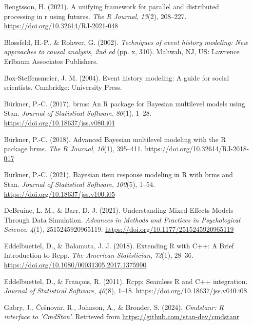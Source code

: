 \documentclass[
  man, donotrepeattitle,floatsintext]{apa6}
\newlength{\cslhangindent}
\newenvironment{CSLReferences}[2] %
 {\begin{list}{}{%
  \setlength{\itemindent}{0pt}
  \setlength{\leftmargin}{0pt}
  \setlength{\parsep}{0pt}
  \ifodd #1
   \setlength{\leftmargin}{\cslhangindent}
   \setlength{\itemindent}{-1\cslhangindent}
  \fi
  \setlength{\itemsep}{#2\baselineskip}}}
 {\end{list}}
\begin{document}
\begin{CSLReferences}{1}{0}
Bengtsson, H. (2021). A unifying framework for parallel and distributed processing in r using futures. \emph{The R Journal}, \emph{13}(2), 208--227. \url{https://doi.org/10.32614/RJ-2021-048}

Blossfeld, H.-P., \& Rohwer, G. (2002). \emph{Techniques of event history modeling: {New} approaches to causal analysis, 2nd ed} (pp. x, 310). Mahwah, NJ, US: Lawrence Erlbaum Associates Publishers.

Box-Steffensmeier, J. M. (2004). Event history modeling: A guide for social scientists. Cambridge: University Press.

Bürkner, P.-C. (2017). {brms}: An {R} package for {Bayesian} multilevel models using {Stan}. \emph{Journal of Statistical Software}, \emph{80}(1), 1--28. \url{https://doi.org/10.18637/jss.v080.i01}

Bürkner, P.-C. (2018). Advanced {Bayesian} multilevel modeling with the {R} package {brms}. \emph{The R Journal}, \emph{10}(1), 395--411. \url{https://doi.org/10.32614/RJ-2018-017}

Bürkner, P.-C. (2021). Bayesian item response modeling in {R} with {brms} and {Stan}. \emph{Journal of Statistical Software}, \emph{100}(5), 1--54. \url{https://doi.org/10.18637/jss.v100.i05}

DeBruine, L. M., \& Barr, D. J. (2021). Understanding {Mixed-Effects Models Through Data Simulation}. \emph{Advances in Methods and Practices in Psychological Science}, \emph{4}(1), 2515245920965119. \url{https://doi.org/10.1177/2515245920965119}

Eddelbuettel, D., \& Balamuta, J. J. (2018). {Extending {R} with {C++}: A Brief Introduction to {Rcpp}}. \emph{The American Statistician}, \emph{72}(1), 28--36. \url{https://doi.org/10.1080/00031305.2017.1375990}

Eddelbuettel, D., \& François, R. (2011). {Rcpp}: Seamless {R} and {C++} integration. \emph{Journal of Statistical Software}, \emph{40}(8), 1--18. \url{https://doi.org/10.18637/jss.v040.i08}

Gabry, J., Češnovar, R., Johnson, A., \& Bronder, S. (2024). \emph{Cmdstanr: R interface to 'CmdStan'}. Retrieved from \url{https://github.com/stan-dev/cmdstanr}


\end{CSLReferences}
\end{document}
